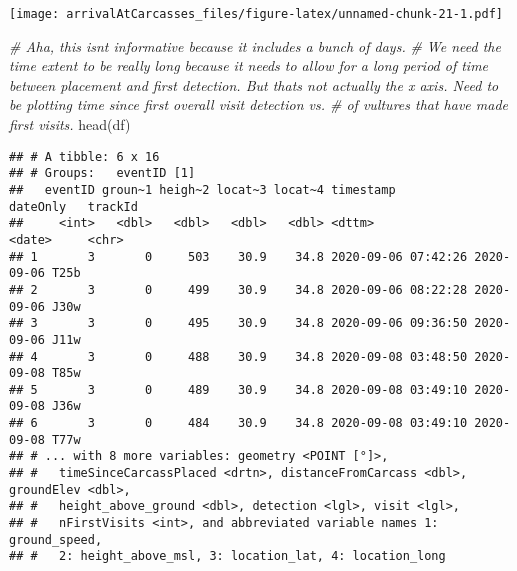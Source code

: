 \documentclass[
]{article}
\newenvironment{Shaded}{\begin{snugshade}}{\end{snugshade}}
\newcommand{\CommentTok}[1]{\textcolor[rgb]{0.56,0.35,0.01}{\textit{#1}}}
\newcommand{\FunctionTok}[1]{\textcolor[rgb]{0.00,0.00,0.00}{#1}}
\newcommand{\NormalTok}[1]{#1}
\begin{document}
\texttt{[image: arrivalAtCarcasses\_files/figure-latex/unnamed-chunk-21-1.pdf]}

\begin{Shaded}
\begin{Highlighting}[]
\CommentTok{\# Aha, this isn\textquotesingle{}t informative because it includes a bunch of days.}
\CommentTok{\# We need the time extent to be really long because it needs to allow for a long period of time between placement and first detection. But that\textquotesingle{}s not actually the x axis. Need to be plotting time since first overall visit detection vs. \# of vultures that have made first visits.}
\FunctionTok{head}\NormalTok{(df)}
\end{Highlighting}
\end{Shaded}

\begin{verbatim}
## # A tibble: 6 x 16
## # Groups:   eventID [1]
##   eventID groun~1 heigh~2 locat~3 locat~4 timestamp           dateOnly   trackId
##     <int>   <dbl>   <dbl>   <dbl>   <dbl> <dttm>              <date>     <chr>  
## 1       3       0     503    30.9    34.8 2020-09-06 07:42:26 2020-09-06 T25b   
## 2       3       0     499    30.9    34.8 2020-09-06 08:22:28 2020-09-06 J30w   
## 3       3       0     495    30.9    34.8 2020-09-06 09:36:50 2020-09-06 J11w   
## 4       3       0     488    30.9    34.8 2020-09-08 03:48:50 2020-09-08 T85w   
## 5       3       0     489    30.9    34.8 2020-09-08 03:49:10 2020-09-08 J36w   
## 6       3       0     484    30.9    34.8 2020-09-08 03:49:10 2020-09-08 T77w   
## # ... with 8 more variables: geometry <POINT [°]>,
## #   timeSinceCarcassPlaced <drtn>, distanceFromCarcass <dbl>, groundElev <dbl>,
## #   height_above_ground <dbl>, detection <lgl>, visit <lgl>,
## #   nFirstVisits <int>, and abbreviated variable names 1: ground_speed,
## #   2: height_above_msl, 3: location_lat, 4: location_long
\end{verbatim}
\end{document}
